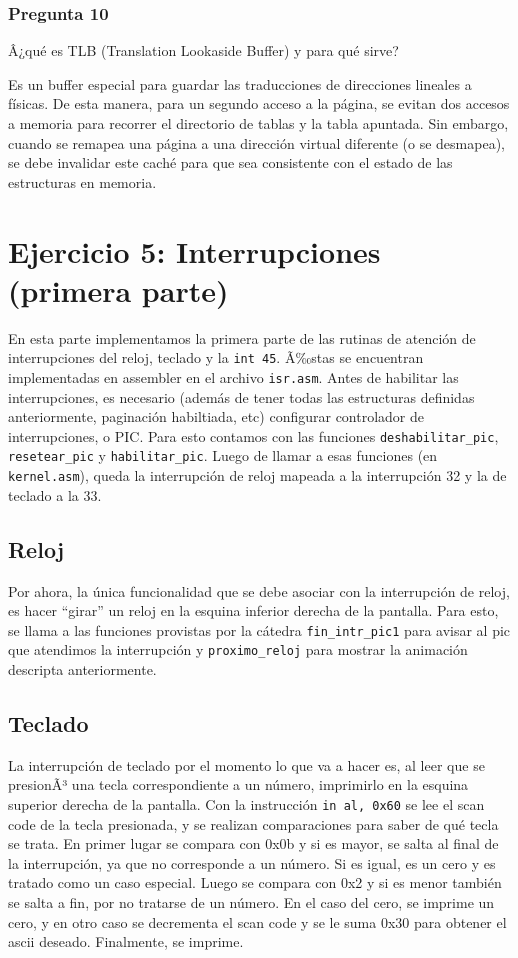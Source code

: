 \documentclass[10pt, a4paper]{article}
\begin{document}
\subsubsection*{Pregunta 10}
 \begin{framed}
Â¿qué es TLB (Translation Lookaside Buffer) y para qué sirve?
\end{framed}
Es un buffer especial para guardar las traducciones de direcciones lineales a físicas. De esta manera, para un segundo acceso a la página, se evitan dos accesos a memoria para recorrer el directorio de tablas y la tabla apuntada. Sin embargo, cuando se remapea una página a una dirección virtual diferente (o se desmapea), se debe invalidar este caché para que sea consistente con el estado de las estructuras en memoria.

\newpage
\section{Ejercicio 5: Interrupciones (primera parte)}
En esta parte implementamos la primera parte de las rutinas de atención de interrupciones del reloj, teclado y la \texttt{int 45}. 
Ã‰stas se encuentran implementadas en assembler en el archivo \texttt{isr.asm}.
Antes de habilitar las interrupciones, es necesario (además de tener todas las estructuras definidas anteriormente, paginación habiltiada, etc) configurar controlador de interrupciones,
o PIC. Para esto contamos con las funciones \texttt{deshabilitar\_pic}, \texttt{resetear\_pic} y \texttt{habilitar\_pic}. Luego de llamar a esas funciones (en \texttt{kernel.asm}), queda la 
interrupción de reloj mapeada a la interrupción 32 y la de teclado a la 33.
\subsection{Reloj}
Por ahora, la única funcionalidad que se debe asociar con la interrupción de reloj, es hacer ``girar'' un reloj en la esquina inferior derecha de la pantalla. 
Para esto, se llama a las funciones provistas por la cátedra \texttt{fin\_intr\_pic1} para avisar al pic que atendimos la interrupción y \texttt{proximo\_reloj} 
para mostrar la animación descripta anteriormente.

\subsection{Teclado}

La interrupción de teclado por el momento lo que va a hacer es, al leer que se presionÃ³ una tecla correspondiente a un número, imprimirlo en la esquina superior 
derecha de la pantalla. Con la instrucción \texttt{in al, 0x60} se lee el scan code de la tecla presionada, y se realizan comparaciones para saber de qué tecla se 
trata. En primer lugar se compara con 0x0b y si es mayor, se salta al final de la interrupción, ya que no corresponde a un número. Si es igual, es un cero y es 
tratado como un caso especial. Luego se compara con 0x2 y si es menor también se salta a fin, por no tratarse de un número. En el caso del cero, se imprime un cero,
y en otro caso se decrementa el scan code y se le suma 0x30 para obtener el ascii deseado. Finalmente, se imprime.
\end{document}
